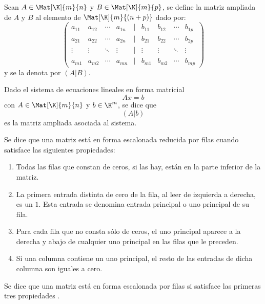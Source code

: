 \documentclass[a4,11pt]{aleph-notas}
\begin{document}
\begin{defi}
    Sean $A\in\Mat[\K]{m}{n}$ y $B\in\Mat[\K]{m}{p}$, se define la matriz ampliada de $A$ y $B$ al elemento de $\Mat[\K]{m}{(n+p)}$ dado por:
    \[
        \begin{pmatrix}
        a_{11}&a_{12}&\cdots&a_{1n}&|&b_{11}&b_{12}&\cdots&b_{1p}\\
        a_{21}&a_{22}&\cdots&a_{2n}&|&b_{21}&b_{22}&\cdots&b_{2p}\\
        \vdots&\vdots&\ddots&\vdots&|&\vdots&\vdots&\ddots&\vdots\\
        a_{m1}&a_{m2}&\cdots&a_{mn}&|&b_{m1}&b_{m2}&\cdots&b_{mp}
        \end{pmatrix}
    \]
    y se la denota por $(A|B)$.
\end{defi}

\begin{defi}
    Dado el sistema de ecuaciones lineales en forma matricial
    \[
        Ax=b
    \]
    con $A\in \Mat[\K]{m}{n}$ y $b\in\K^m$, se dice que 
    \[
        (A|b)
    \]
    es la matriz ampliada asociada al sistema.
\end{defi}

\begin{defi}
    Se dice que una matriz está en forma escalonada reducida por filas cuando satisface las siguientes propiedades:
    \begin{enumerate}
    \item 
        Todas las filas que constan de ceros, si las hay, están en la parte inferior de la matriz. 
    \item 
        La primera entrada distinta de cero de la fila, al leer de izquierda a derecha, es un $1$. Esta entrada se denomina entrada principal o uno principal de su fila. 
    \item 
        Para cada fila que no consta sólo de ceros, el uno principal aparece a la derecha y abajo de cualquier uno principal en las filas que le preceden. 
    \item 
        Si una columna contiene un uno principal, el resto de las entradas de dicha columna son iguales a cero. 
    \end{enumerate}
    Se dice que una matriz está en forma escalonada por filas si satisface las primeras tres propiedades . 
\end{defi}
\end{document}
